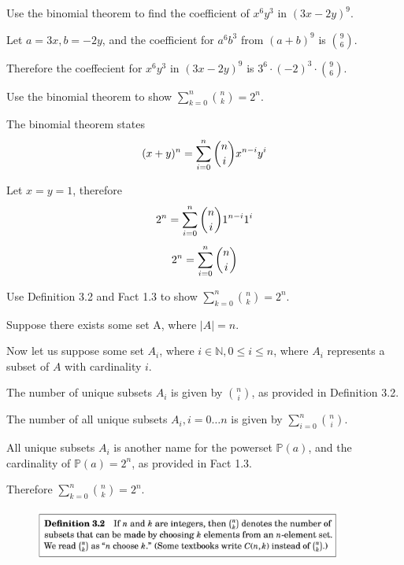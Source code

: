 \documentclass[openany, 11pt]{book}
\begin{document}
\begin{exercise}{}{}
	Use the binomial theorem to find the coefficient of $x^6y^3$
	in $(3x-2y)^9$.
	\begin{alist}
		\item Let $a=3x, b=-2y$, and the coefficient for $a^6b^3$ from $(a+b)^9$
		is $\binom{9}{6}$.
		\item Therefore the coeffecient for $x^6y^3$ in $(3x-2y)^9$ is
		$3^6\cdot(-2)^3\cdot\binom{9}{6}$.
	\end{alist}
\end{exercise}

\begin{exercise}{}{}
	Use the binomial theorem to show $\sum\limits_{k=0}^n\binom{n}{k}=2^n$.
	\begin{alist}
		\item The binomial theorem states
		$$(x+y)^n=\sum\limits_{i=0}^n\dbinom{n}{i}x^{n-i}y^i$$
		\item Let $x=y=1$, therefore
		$$2^n=\sum\limits_{i=0}^n\dbinom{n}{i}1^{n-i}1^i$$
		$$2^n=\sum\limits_{i=0}^n\dbinom{n}{i}$$
	\end{alist}
\end{exercise}

\begin{exercise}{}{}
	Use Definition 3.2 and Fact 1.3 to show $\sum\limits_{k=0}^n\binom{n}{k}=2^n$.
	\begin{alist}
		\item Suppose there exists some set A, where $|A|=n$.
		\item Now let us suppose some set $A_i$, where $i\in \mathbb{N}, 0\leq i
			\leq n$, where $A_i$ represents a subset of $A$ with cardinality $i$.
		\item The number of unique subsets $A_i$ is given by $\binom{n}{i}$, as
		provided in Definition 3.2.
		\item The number of all unique subsets $A_i, i=0\ldots n$ is given by
		$\sum\limits_{i=0}^n\binom{n}{i}$.
		\item All unique subsets $A_i$ is another name for the powerset $\mathbb{P}(a)$,
		and the cardinality of $\mathbb{P}(a)=2^n$, as provided in Fact 1.3.
		\item Therefore $\sum\limits_{k=0}^n\binom{n}{k}=2^n$.
	\end{alist}
\end{exercise}

\begin{figure}
	\centering
	\includegraphics[width=0.9\textwidth]{images/definition03_02.png}
\end{figure}
\end{document}
